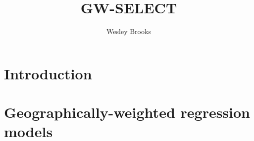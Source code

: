 \documentclass[authoryear, review, 11pt]{elsarticle}
\title{GW-SELECT}
\author{Wesley Brooks}
\date{}                                           %
\begin{document}
\maketitle





\section{Introduction}

	

	
\section{Geographically-weighted regression models \label{section:model}}
\end{document}
